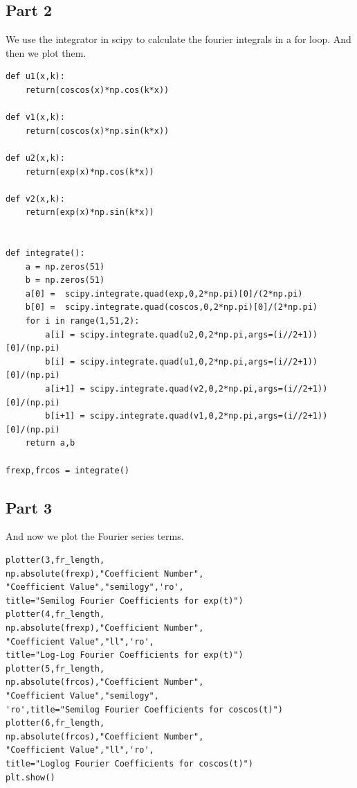 \documentclass[11pt, a4paper]{article}
\begin{document}
\subsection{Part 2}
We use the integrator in scipy to calculate the fourier integrals in a for loop.
And then we plot them.
\begin{verbatim}
def u1(x,k):
    return(coscos(x)*np.cos(k*x))

def v1(x,k):
    return(coscos(x)*np.sin(k*x))

def u2(x,k):
    return(exp(x)*np.cos(k*x))

def v2(x,k):
    return(exp(x)*np.sin(k*x))


def integrate():
    a = np.zeros(51)
    b = np.zeros(51)
    a[0] =  scipy.integrate.quad(exp,0,2*np.pi)[0]/(2*np.pi)
    b[0] =  scipy.integrate.quad(coscos,0,2*np.pi)[0]/(2*np.pi)
    for i in range(1,51,2):
        a[i] = scipy.integrate.quad(u2,0,2*np.pi,args=(i//2+1))[0]/(np.pi)
        b[i] = scipy.integrate.quad(u1,0,2*np.pi,args=(i//2+1))[0]/(np.pi)
        a[i+1] = scipy.integrate.quad(v2,0,2*np.pi,args=(i//2+1))[0]/(np.pi)
        b[i+1] = scipy.integrate.quad(v1,0,2*np.pi,args=(i//2+1))[0]/(np.pi)
    return a,b

frexp,frcos = integrate()
\end{verbatim}
\subsection{Part 3}

And now we plot the Fourier series terms.

\begin{verbatim}
plotter(3,fr_length,
np.absolute(frexp),"Coefficient Number",
"Coefficient Value","semilogy",'ro',
title="Semilog Fourier Coefficients for exp(t)")
plotter(4,fr_length,
np.absolute(frexp),"Coefficient Number",
"Coefficient Value","ll",'ro',
title="Log-Log Fourier Coefficients for exp(t)")
plotter(5,fr_length,
np.absolute(frcos),"Coefficient Number",
"Coefficient Value","semilogy",
'ro',title="Semilog Fourier Coefficients for coscos(t)")
plotter(6,fr_length,
np.absolute(frcos),"Coefficient Number",
"Coefficient Value","ll",'ro',
title="Loglog Fourier Coefficients for coscos(t)")
plt.show()
\end{verbatim}
\end{document}
